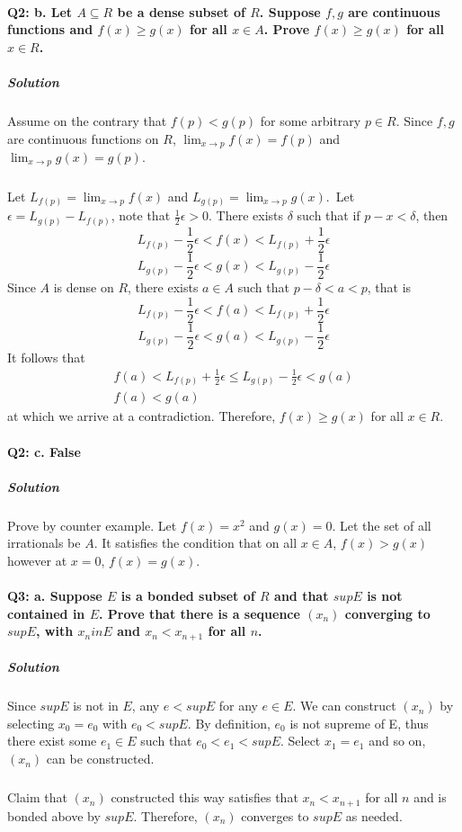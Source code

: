 \documentclass{article}
\begin{document}
\paragraph{Q2: b. Let $A \subseteq R$ be a dense subset of $R$. Suppose $f, g$ are continuous functions and $f(x) \geq g(x)$ for all $x \in A$. Prove $f(x) \geq g(x)$ for all $x \in R$.}
\subparagraph{Solution}
Assume on the contrary that $f(p) < g(p)$ for some arbitrary $p \in R$.
Since $f, g$ are continuous functions on $R$, $\lim_{x\to p} f(x) = f(p)$ and $\lim_{x\to p} g(x) = g(p)$.
\subparagraph{}
Let $L_{f(p)} = \lim_{x\to p} f(x)$ and $L_{g(p)} = \lim_{x\to p} g(x)$.\
Let $\epsilon = L_{g(p)} - L_{f(p)}$, note that $\frac{1}{2} \epsilon > 0$. There exists $\delta$ such that if $p - x < \delta$, then 
\begin{equation*} 
L_{f(p)} - \frac{1}{2} \epsilon < f(x) < L_{f(p)} + \frac{1}{2} \epsilon
\end{equation*} 
\begin{equation*} 
L_{g(p)} - \frac{1}{2} \epsilon < g(x) < L_{g(p)} - \frac{1}{2} \epsilon
\end{equation*}
Since $A$ is dense on $R$, there exists $a \in A$ such that $p - \delta < a < p$, that is
\begin{equation} \label{eq1}
L_{f(p)} - \frac{1}{2} \epsilon < f(a) < L_{f(p)} + \frac{1}{2} \epsilon
\end{equation} 
\begin{equation} \label{eq2}
L_{g(p)} - \frac{1}{2} \epsilon < g(a) < L_{g(p)} - \frac{1}{2} \epsilon
\end{equation}
It follows that 
\begin{equation} \label{}
\begin{split}
f(a) < L_{f(p)} + \frac{1}{2} \epsilon \leq L_{g(p)} - \frac{1}{2} \epsilon < g(a) \\
f(a) < g(a)
\end{split}
\end{equation}
at which we arrive at a contradiction. Therefore, $f(x) \geq g(x)$ for all $x \in R$.
\paragraph{Q2: c. False}\subparagraph{Solution}
Prove by counter example. Let $f(x) = x^2$ and $g(x) = 0$. Let the set of all irrationals be $A$. It satisfies the condition that on all $x \in A$, $f(x) > g(x)$ however at $x = 0$, $f(x) = g(x)$. 
\paragraph{Q3: a. Suppose $E$ is a bonded subset of $R$ and that $sup E$ is not contained in $E$. Prove that there is a sequence $(x_n)$ converging to $sup E$, with $x_n in E$ and $x_n < x_{n+1}$ for all $n$.}
\subparagraph{Solution}
Since $supE$ is not in $E$, any $e < supE$ for any $e \in E$. We can construct $(x_n)$ by selecting $x_0 = e_0$ with $e_0 < supE$. By definition, $e_0$ is not supreme of E, thus there exist some $e_1 \in E$ such that $e_0 < e_1 < supE$. Select $x_1 = e_1$ and so on, $(x_n)$ can be constructed.
\subparagraph{}
Claim that $(x_n)$ constructed this way satisfies that $x_n < x_{n+1}$ for all $n$ and is bonded above by $supE$. Therefore, $(x_n)$ converges to $supE$ as needed.
\end{document}
